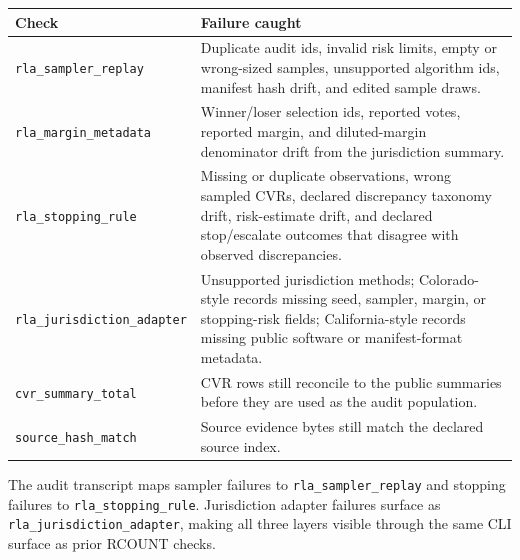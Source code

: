 \begin{center}
\small
\begin{tabularx}{\textwidth}{lX}
\toprule
Check & Failure caught \\
\midrule
\texttt{rla\_sampler\_replay} & Duplicate audit ids, invalid risk limits, empty or wrong-sized samples, unsupported algorithm ids, manifest hash drift, and edited sample draws. \\
\texttt{rla\_margin\_metadata} & Winner/loser selection ids, reported votes, reported margin, and diluted-margin denominator drift from the jurisdiction summary. \\
\texttt{rla\_stopping\_rule} & Missing or duplicate observations, wrong sampled CVRs, declared discrepancy taxonomy drift, risk-estimate drift, and declared stop/escalate outcomes that disagree with observed discrepancies. \\
\texttt{rla\_jurisdiction\_adapter} & Unsupported jurisdiction methods; Colorado-style records missing seed, sampler, margin, or stopping-risk fields; California-style records missing public software or manifest-format metadata. \\
\texttt{cvr\_summary\_total} & CVR rows still reconcile to the public summaries before they are used as the audit population. \\
\texttt{source\_hash\_match} & Source evidence bytes still match the declared source index. \\
\bottomrule
\end{tabularx}
\end{center}

The audit transcript maps sampler failures to
\texttt{rla\_sampler\_replay} and stopping failures to
\texttt{rla\_stopping\_rule}. Jurisdiction adapter failures surface as
\texttt{rla\_jurisdiction\_adapter}, making all three layers visible through
the same CLI surface as prior RCOUNT checks.
